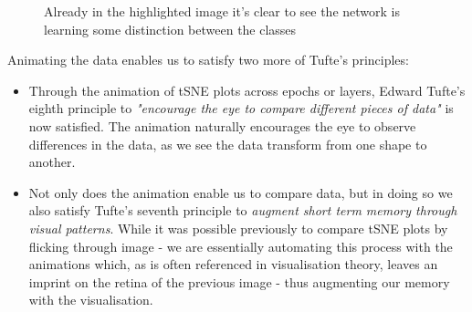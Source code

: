 \documentclass[a4paper,11pt,titlepage]{article}
\begin{document}
	\begin{figure}[H]
    			\caption{Already in the highlighted image it's clear to see the network is learning some distinction between the classes}%
	\end{figure}	
	
	Animating the data enables us to satisfy two more of Tufte's principles:
	\begin{itemize}
		\item Through the animation of tSNE plots across epochs or layers, Edward Tufte's eighth principle to \textit{"encourage the eye to compare different pieces of data"} is now satisfied. The animation naturally encourages the eye to observe differences in the data, as we see the data transform from one shape to another. 
		\item Not only does the animation enable us to compare data, but in doing so we also satisfy Tufte's seventh principle to \textit{augment short term memory through visual patterns}. While it was possible previously to compare tSNE plots by flicking through image - we are essentially automating this process with the animations which, as is often referenced in visualisation theory, leaves an imprint on the retina of the previous image - thus augmenting our memory with the visualisation. 
	\end{itemize}
	
\end{document}
